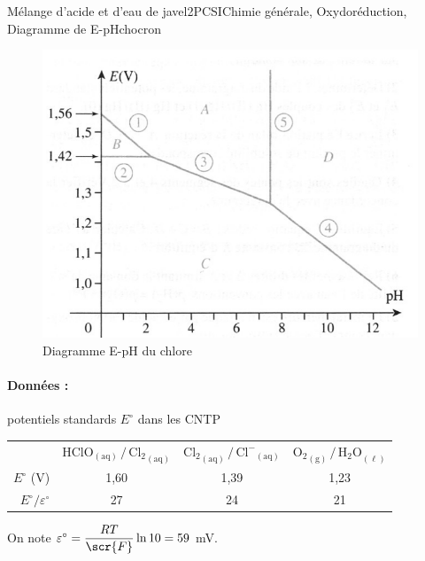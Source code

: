 \begin{exercise}{Mélange d'acide et d'eau de javel}{2}{PCSI}{Chimie générale, Oxydoréduction, Diagramme de E-pH}{chocron}
\begin{questions}
\end{questions}
\begin{figure}[H]
    \centering
    \includegraphics{chimiePC/gene/e-ph_chlore.pdf}
    \caption{Diagramme E-pH du chlore}
   
\end{figure}

\paragraph{Données : } potentiels standards $E^\circ$ dans les CNTP
\begin{center}\begin{tabularx}{.7\linewidth}{rCCC}
    \hline
    & $\mathrm{{HClO}_{(aq)} \,/\, {Cl_2}_{(aq)}}$
    & $\mathrm{{Cl_2}_{(aq)} \,/\, {Cl^-}_{(aq)}}$
    & $\mathrm{{O_2}_{(g)} \,/\, {H_2O}_{(\ell)}}$ \\
    $E^\circ$ (V) & 1,60 & 1,39 & 1,23 \\
    $E^\circ / \varepsilon^\circ$ & 27 & 24 & 21 \\ \hline\hline 
\end{tabularx}
\end{center}

On note $\varepsilon^\circ = \dfrac{RT}{\scr{F}} \ln10 = 59$ mV.


\end{exercise}



